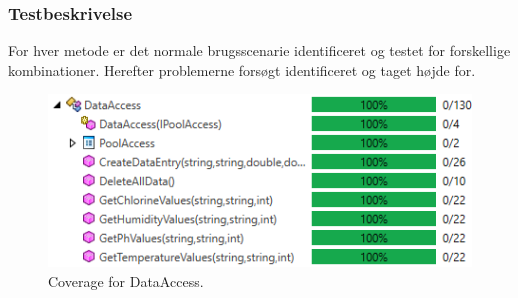 \subsubsection{Testbeskrivelse}
For hver metode er det normale brugsscenarie identificeret og testet for forskellige kombinationer. Herefter problemerne forsøgt identificeret og taget højde for.

\begin{figure}[H]
	\centering
	\includegraphics[width=0.7\linewidth]{figs/test/dataaccesscoverage}
	\caption{Coverage for DataAccess.}
	\label{fig:dataaccesscoverage}
\end{figure}